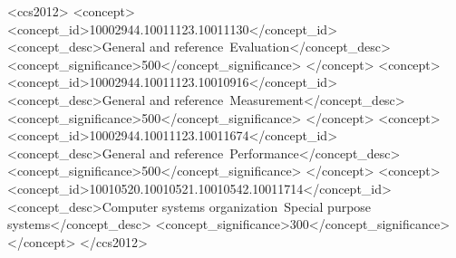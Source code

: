 \documentclass[sigconf,authordraft]{acmart}
\begin{document}
\begin{CCSXML}
  <ccs2012>
     <concept>
         <concept_id>10002944.10011123.10011130</concept_id>
         <concept_desc>General and reference~Evaluation</concept_desc>
         <concept_significance>500</concept_significance>
         </concept>
     <concept>
         <concept_id>10002944.10011123.10010916</concept_id>
         <concept_desc>General and reference~Measurement</concept_desc>
         <concept_significance>500</concept_significance>
         </concept>
     <concept>
         <concept_id>10002944.10011123.10011674</concept_id>
         <concept_desc>General and reference~Performance</concept_desc>
         <concept_significance>500</concept_significance>
         </concept>
     <concept>
         <concept_id>10010520.10010521.10010542.10011714</concept_id>
         <concept_desc>Computer systems organization~Special purpose systems</concept_desc>
         <concept_significance>300</concept_significance>
         </concept>
   </ccs2012>
\end{CCSXML}
  

\keywords{}



\maketitle
\end{document}
